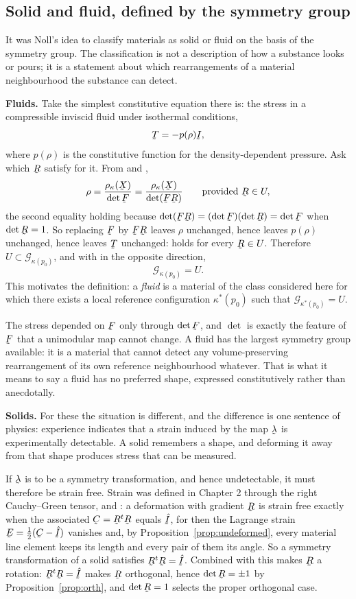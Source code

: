 \subsection*{Solid and fluid, defined by the symmetry group}

It was Noll's idea to classify materials as solid or fluid on the basis
of the symmetry group. The classification is not a description of how a
substance looks or pours; it is a statement about which rearrangements
of a material neighbourhood the substance can detect.

\medskip
\noindent\textbf{Fluids.} Take the simplest constitutive equation there
is: the stress in a compressible inviscid fluid under isothermal
conditions,
\[
   \bT=-p(\rho)\I ,
\]
where $p(\rho)$ is the constitutive function for the density-dependent
pressure. Ask which $\bR$ satisfy  for it. From  and
,
\[
   \rho=\frac{\rho_{\kappa}(\bX)}{\det\bF}
   =\frac{\rho_{\kappa}(\bX)}{\det(\bF\bR)}
   \qquad\text{provided }\bR\in U,
\]
the second equality holding because $\det(\bF\bR)=(\det\bF)(\det\bR)=
\det\bF$ when $\det\bR=1$. So replacing $\bF$ by $\bF\bR$ leaves $\rho$
unchanged, hence leaves $p(\rho)$ unchanged, hence leaves $\bT$
unchanged:  holds for every $\bR\in U$. Therefore
$U\subset\mathcal{G}_{\kappa(p_{0})}$, and with  in the
opposite direction,
\[
   \mathcal{G}_{\kappa(p_{0})}=U .
\]
This motivates the definition: a \emph{fluid} is a material of the class
considered here for which there exists a local reference configuration
$\kappa^{*}(p_{0})$ such that
$\mathcal{G}_{\kappa^{*}(p_{0})}=U$.

The stress depended on $\bF$ only through $\det\bF$, and $\det$ is
exactly the feature of $\bF$ that a unimodular map cannot change. A
fluid has the largest symmetry group available: it is a material that
cannot detect any volume-preserving rearrangement of its own reference
neighbourhood whatever. That is what it means to say a fluid has no
preferred shape, expressed constitutively rather than anecdotally.

\medskip
\noindent\textbf{Solids.} For these the situation is different, and the
difference is one sentence of physics: experience indicates that a
strain induced by the map $\vek{\lambda}$ is experimentally detectable.
A solid remembers a shape, and deforming it away from that shape
produces stress that can be measured.

If $\vek{\lambda}$ is to be a symmetry transformation, and hence
undetectable, it must therefore be strain free. Strain was defined in
Chapter 2 through the right Cauchy--Green tensor,  and
: a deformation with gradient $\bR$ is strain free exactly
when the associated $\bC=\bR^{t}\bR$ equals $\hI$, for then the Lagrange
strain $\bE=\tfrac12(\bC-\hI)$ vanishes and, by
Proposition~\ref{prop:undeformed}, every material line element keeps its
length and every pair of them its angle. So a symmetry transformation of
a solid satisfies $\bR^{t}\bR=\hI$. Combined with  this makes
$\bR$ a rotation: $\bR^{t}\bR=\hI$ makes $\bR$ orthogonal, hence
$\det\bR=\pm1$ by Proposition~\ref{prop:orth}, and $\det\bR=1$ selects
the proper orthogonal case.

